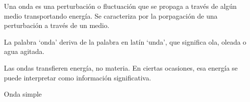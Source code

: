 Una onda es una perturbación o fluctuación que se propaga a través de algún medio transportando energía. Se caracteriza por la porpagación de una perturbación a través de un medio.

La palabra `onda' deriva de la palabra en latín `unda', que significa ola, oleada o agua agitada.

Las ondas transfieren energía, no materia. En ciertas ocasiones, esa energía se puede interpretar como información significativa.

\begin{grafica}
\centering
{}
\caption{Onda simple}
\end{grafica}
